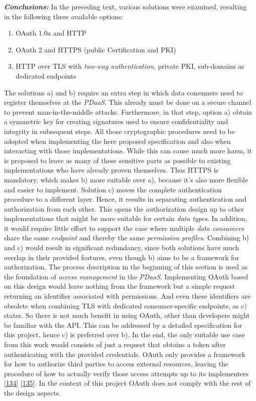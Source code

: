 \documentclass[12pt,english,a4paper,titlepage,cleardoublepage=empty,dottedtoc]{report}
\providecommand{\tightlist}{%
  \setlength{\itemsep}{0pt}\setlength{\parskip}{0pt}}
\begin{document}
\emph{\textbf{Conclusions:}} In the preceding text, various solutions
were examined, resulting in the following three available options:

\begin{enumerate}
\def\labelenumi{\alph{enumi})}
\tightlist
\item
  OAuth 1.0a and HTTP
\item
  OAuth 2 and HTTPS (public Certification and PKI)
\item
  HTTP over TLS with \emph{two-way authentication}, private PKI,
  sub-domains as dedicated endpoints
\end{enumerate}

The solutions a) and b) require an extra step in which data consumers
need to register themselves at the \emph{PDaaS}. This already must be
done on a secure channel to prevent man-in-the-middle attacks.
Furthermore, in that step, option a) obtain a symmetric key for creating
signatures used to ensure confidentiality and integrity in subsequent
steps. All those cryptographic procedures need to be adopted when
implementing the here proposed specification and also when interacting
with those implementations. While this can cause much more harm, it is
proposed to leave as many of these sensitive parts as possible to
existing implementations who have already proven themselves. Thus HTTPS
is mandatory, which makes b) more suitable over a), because it's also
more flexible and easier to implement. Solution c) moves the complete
authentication procedure to a different layer. Hence, it results in
separating authentication and authorization from each other. This opens
the authorization design up to other implementations that might be more
suitable for certain \emph{data types}. In addition, it would require
little effort to support the case where multiple \emph{data consumers}
share the same \emph{endpoint} and thereby the same \emph{permission
profiles}. Combining b) and c) would result in significant redundancy,
since both solutions have much overlap in their provided features, even
though b) aims to be a framework for authorization. The process
description in the beginning of this section is used as the foundation
of \emph{access management} in the \emph{PDaaS}. Implementing OAuth
based on this design would leave nothing from the framework but a simple
request returning an identifier associated with permissions. And even
these identifiers are obsolete when combining TLS with dedicated
consumer-specific endpoints, as c) states. So there is not much benefit
in using OAuth, other than developers might be familiar with the API.
This can be addressed by a detailed specification for this project,
hence c) is preferred over b). In the end, the only suitable use case
from this work would consists of just a request that obtains a token
after authenticating with the provided credentials. OAuth only provides
a framework for how to authorize third parties to access external
resources, leaving the procedure of how to actually verify those access
attempts up to its implementers
{[}\protect\hyperlink{ref-web_spec_oauth-1a_access-verification}{134}{]}
{[}\protect\hyperlink{ref-web_spec_oauth-2_access-verification}{135}{]}.
In the context of this project OAuth does not comply with the rest of
the design aspects.
\end{document}
